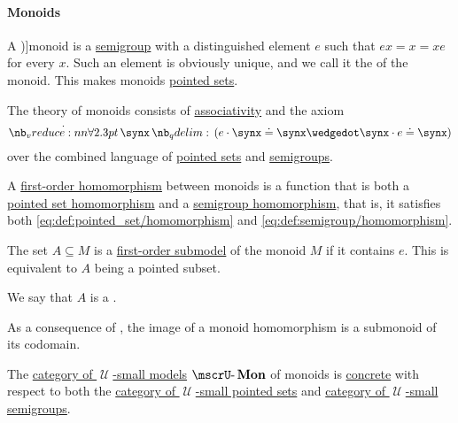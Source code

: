 \paragraph{Monoids}

\begin{definition}\label{def:monoid}
  A \term[ru=моноид (\cite[94]{Мальцев1970ОбщаяАлгебра})]{monoid} is a \hyperref[def:semigroup]{semigroup} with a distinguished element \( e \) such that \( ex = x = xe \) for every \( x \). Such an element is obviously unique, and we call it the  of the monoid. This makes monoids \hyperref[def:pointed_set]{pointed sets}.

  \begin{thmenum}
    \mimprovised The theory of monoids consists of \hyperref[eq:def:binary_operation/associative]{associativity} and the axiom
    \begin{equation}\label{eq:def:monoid/theory/neutral}
      \qforall \synx (e \cdot \synx \syneq \synx \synwedge \synx \cdot e \syneq \synx)
    \end{equation}
    over the combined language of \hyperref[def:pointed_set/theory]{pointed sets} and \hyperref[def:semigroup/theory]{semigroups}.

     A \hyperref[def:first_order_homomorphism]{first-order homomorphism} between monoids is a function that is both a \hyperref[def:pointed_set/homomorphism]{pointed set homomorphism} and a \hyperref[def:semigroup/homomorphism]{semigroup homomorphism}, that is, it satisfies both \eqref{eq:def:pointed_set/homomorphism} and \eqref{eq:def:semigroup/homomorphism}.

     The set \( A \subseteq M \) is a \hyperref[def:first_order_submodel]{first-order submodel} of the monoid \( M \) if it contains \( e \). This is equivalent to \( A \) being a pointed subset.

    We say that \( A \) is a .

    As a consequence of , the image of a monoid homomorphism is a submonoid of its codomain.

     The \hyperref[def:category_of_small_first_order_models]{category of \( \mscrU \)-small models} \( \ucat{Mon} \) of monoids is \hyperref[def:concrete_category]{concrete} with respect to both the \hyperref[def:pointed_set/category]{category of \( \mscrU \)-small pointed sets} and \hyperref[def:semigroup/category]{category of \( \mscrU \)-small semigroups}.


\end{thmenum}
\end{definition}
